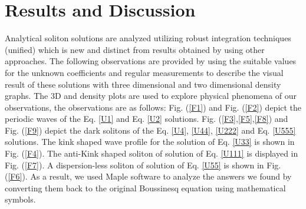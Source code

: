 \documentclass{article}
\numberwithin{equation}{section}
\begin{document}
\section{Results and Discussion}\label{s4}
Analytical soliton solutions are analyzed utilizing robust integration techniques (unified) which is new and distinct from results obtained by using other approaches. The following observations are provided by using the suitable values for the unknown coefficients and regular measurements to describe the visual result of these solutions with three dimensional and two dimensional density graphs. The 3D and density plots are used to explore physical phenomena of our observations, the observations are as follows: Fig. (\ref{F1}) and Fig. (\ref{F2}) depict the periodic waves of the Eq. \ref{U1} and Eq. \ref{U2} solutions. Fig. (\ref{F3},\ref{F5},\ref{F8}) and Fig. (\ref{F9}) depict the dark solitons of the Eq. \ref{U4}, \ref{U44}, \ref{U222} and Eq. \ref{U555} solutions. The kink shaped wave profile for the solution of Eq. \ref{U33} is shown in Fig. (\ref{F4}). The anti-Kink shaped soliton of solution of Eq. \ref{U111} is displayed in Fig. (\ref{F7}). A dispersion-less soliton of solution of Eq. \ref{U55} is shown in Fig. (\ref{F6}). As a result, we used Maple software to analyze the answers we found by converting them back to the original Boussinesq equation using mathematical symbols.
\end{document}
